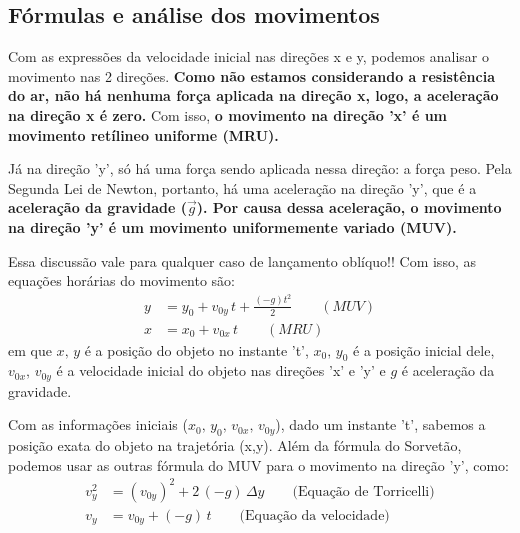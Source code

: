 \documentclass[12pt]{extarticle}
\newcommand{\<}{\langle}
\renewcommand{\>}{\rangle}
\theoremstyle{definition}
\begin{document}
\subsection{Fórmulas e análise dos movimentos}
Com as expressões da velocidade inicial nas direções x e y, podemos analisar o movimento nas 2 direções. \textbf{Como não estamos considerando a resistência do ar, não há nenhuma força aplicada na direção x, logo, a aceleração na direção x é zero.} Com isso, \textbf{o movimento na direção 'x' é um movimento retílineo uniforme (MRU).}

Já na direção 'y', só há uma força sendo aplicada nessa direção: a força peso. Pela Segunda Lei de Newton, portanto, há uma aceleração na direção 'y', que é a \textbf{aceleração da gravidade ($\vec{g}$). Por causa dessa aceleração, o movimento na direção 'y' é um movimento uniformemente variado (MUV).}

Essa discussão vale para qualquer caso de lançamento oblíquo!! Com isso, as equações horárias do movimento são:
\begin{equation}\label{eq:1}
    \begin{split}
        y &= y_0 + v_{0y}\,t + \frac{(-g)t^2}{2}\quad\quad (MUV)\\
        x &= x_0 + v_{0x}\,t\quad\quad (MRU)
    \end{split}
\end{equation}
\noindent em que $x,\,y$ é a posição do objeto no instante 't', $x_0,\,y_0$ é a posição inicial dele, $v_{0x},\,v_{0y}$ é a velocidade inicial do objeto nas direções 'x' e 'y' e $g$ é aceleração da gravidade.

Com as informações iniciais ($x_0,\,y_0,\,v_{0x},\,v_{0y}$), dado um instante 't', sabemos a posição exata do objeto na trajetória (x,y). Além da fórmula do Sorvetão, podemos usar as outras fórmula do MUV para o movimento na direção 'y', como:
\begin{equation}
    \begin{split}
        v_y^2 &= (v_{0y})^2 + 2\,(-g)\,\Delta y\quad\quad \text{(Equação de Torricelli)}\\
        v_y &= v_{0y} + (-g)\,t \quad\quad \text{(Equação da velocidade)}
    \end{split}
\end{equation}
\end{document}
